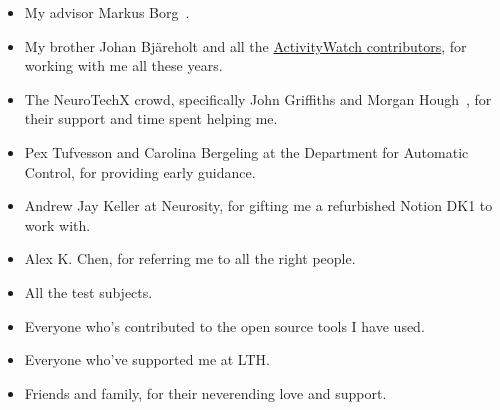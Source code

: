 \begin{itemize}
 \item My advisor Markus Borg~.
 \item My brother Johan Bjäreholt and all the \href{https://activitywatch.net/contributors/}{ActivityWatch contributors}, for working with me all these years.
 \item The NeuroTechX crowd, specifically John Griffiths and Morgan Hough~, for their support and time spent helping me.
 \item Pex Tufvesson and Carolina Bergeling at the Department for Automatic Control, for providing early guidance.
 \item Andrew Jay Keller at Neurosity, for gifting me a refurbished Notion DK1 to work with.
 \item Alex K. Chen, for referring me to all the right people.
 \item All the test subjects.
 \item Everyone who's contributed to the open source tools I have used.
 \item Everyone who've supported me at LTH\@.
 \item Friends and family, for their neverending love and support.
\end{itemize}
